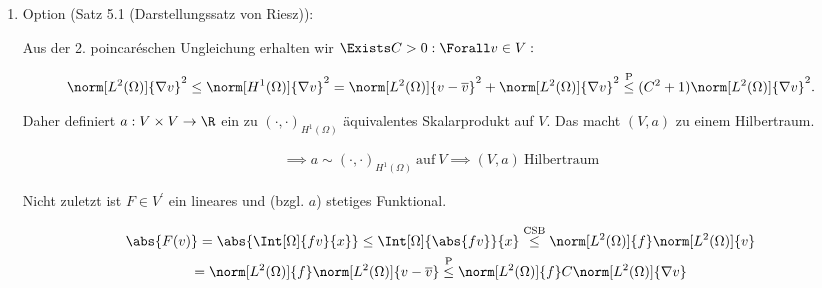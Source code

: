 \begin{solution}
\begin{enumerate}[label = \alph*)]
\begin{enumerate}[label = \arabic*.]
\begin{itemize}
            \item Stetigkeit von $F$:

            \begin{align*}
                \abs{F(v)}
                =
                \abs{\Int[\Omega]{f v}{x}}
                \leq
                \Int[\Omega]{\abs{f v}}{x}
                =
                \norm[L^1(\Omega)]{f v}
                \stackrel
                {
                \mathrm{CSB}
                }{\leq}
                \norm[L^2(\Omega)]{f} \norm[L^2(\Omega)]{v}
                \leq
                \norm[L^2(\Omega)]{f} \norm[H^1(\Omega)]{v}
            \end{align*}

        \end{itemize}

        \item Option (Satz 5.1 (Darstellungssatz von Riesz)):



        Aus der 2. poincaréschen Ungleichung erhalten wir $\Exists C > 0: \Forall v \in V:$

        \begin{align*}
            \norm[L^2(\Omega)]{\nabla v}^2
            \leq
            \norm[H^1(\Omega)]{\nabla v}^2
            =
            \norm[L^2(\Omega)]{v - \overline{v}}^2 + \norm[L^2(\Omega)]{\nabla v}^2
            \stackrel
            {
                \mathrm{P}
            }{\leq}
            (C^2 + 1) \norm[L^2(\Omega)]{\nabla v}^2.
        \end{align*}

        Daher definiert $a: V \times V \to \R$ ein zu $(\cdot, \cdot)_{H^1(\Omega)}$ äquivalentes Skalarprodukt auf $V$.
        Das macht $(V, a)$ zu einem Hilbertraum.

        \begin{align*}
            \implies
            a \sim (\cdot, \cdot)_{H^1(\Omega)} ~\text{auf}~ V
            \implies
            (V, a) ~\text{Hilbertraum}
        \end{align*}

        Nicht zuletzt ist $F \in V^\prime$ ein lineares und (bzgl. $a$) stetiges Funktional.

        \begin{multline*}
            \abs{F(v)}
            =
            \abs{\Int[\Omega]{f v}{x}}
            \leq
            \Int[\Omega]{\abs{f v}}{x}
            \stackrel
            {
                \mathrm{CSB}
            }{\leq}
            \norm[L^2(\Omega)]{f} \norm[L^2(\Omega)]{v} \\
            =
            \norm[L^2(\Omega)]{f} \norm[L^2(\Omega)]{v - \overline{v}}
            \stackrel
            {
                \mathrm{P}
            }{\leq}
            \norm[L^2(\Omega)]{f} C \norm[L^2(\Omega)]{\nabla v}
        \end{multline*}


\end{enumerate}
\end{enumerate}
\end{solution}
